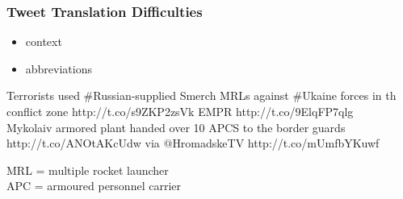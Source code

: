 \documentclass[12pt]{beamer}
\begin{document}
\begin{frame}
	\frametitle{Tweet Translation Difficulties}
	\begin{itemize}
		\item \textcolor{TCTsilver}{\Large context}
		\item \textcolor{TCTsilver}{\Large abbreviations}
	\end{itemize}
\end{frame}


\begin{frame}
	\begin{center}
		Terrorists used \#Russian-supplied Smerch \alert<2>{MRL}s against \#Ukaine forces in th conflict zone http://t.co/s9ZKP2zsVk EMPR http://t.co/9ElqFP7qlg
		\\[0.7cm]
		Mykolaiv armored plant handed over 10 \alert<2>{APC}S  to the border guards  http://t.co/ANOtAKcUdw via $@$HromadskeTV http://t.co/mUmfbYKuwf
	\end{center}
	 {\alert<2>{MRL} = multiple rocket launcher\\
	\alert<2>{APC} = armoured personnel carrier}
\end{frame}
\end{document}
